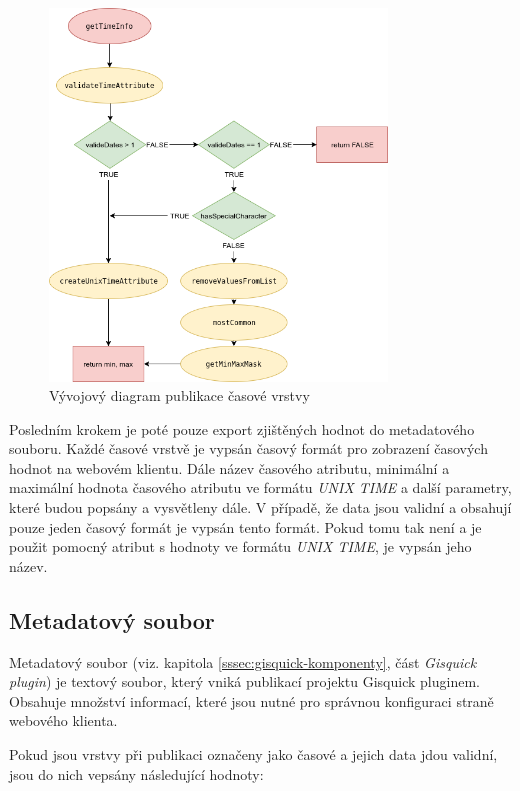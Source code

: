 \begin{figure}[h!]
\centering
\includegraphics[width=0.8\textwidth]{../img/getTimeInfo.png}
\caption{Vývojový diagram publikace časové vrstvy}
\label{fig:plugin-chart}
\end{figure}

Posledním krokem je poté pouze export zjištěných hodnot do metadatového
souboru. Každé časové vrstvě je vypsán časový formát pro zobrazení
časových hodnot na webovém klientu. Dále název časového atributu,
minimální a maximální hodnota časového atributu ve formátu \textit{UNIX
TIME} a další parametry, které budou popsány a vysvětleny dále. V
případě, že data jsou validní a obsahují pouze jeden časový formát
je vypsán tento formát. Pokud tomu tak není a je použit pomocný atribut
s hodnoty ve formátu \textit{UNIX TIME}, je vypsán jeho název.

\subsection{Metadatový soubor}
\label{sssec:metadata}

Metadatový soubor (viz. kapitola \ref{sssec:gisquick-komponenty}, část
\textit{Gisquick plugin}) je textový soubor, který vniká publikací
projektu Gisquick pluginem. Obsahuje množství informací, které jsou
nutné pro správnou konfiguraci straně webového klienta.

Pokud jsou vrstvy při publikaci označeny jako časové a jejich data jdou
validní, jsou do nich vepsány následující hodnoty:

